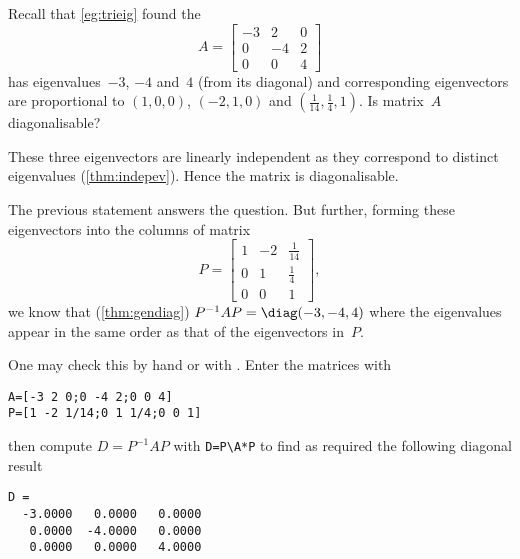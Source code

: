 \begin{example} \label{eg:trieigp}
Recall that \autoref{eg:trieig} found the 
\begin{equation*}
A=\begin{bmatrix}-3&2&0
\\0&-4&2
\\0&0&4\end{bmatrix}
\end{equation*}
has eigenvalues~\(-3\), \(-4\) and~\(4\) (from its diagonal) and corresponding eigenvectors are proportional to \((1,0,0)\), \((-2,1,0)\) and \((\frac1{14},\frac14,1)\).
Is matrix~\(A\) diagonalisable?
\begin{solution} 
These three eigenvectors are linearly independent as they correspond to distinct eigenvalues (\autoref{thm:indepev}).
Hence the matrix is diagonalisable.

The previous statement answers the question. 
But further, forming these eigenvectors into the columns of matrix
\begin{equation*}
P=\begin{bmatrix} 1&-2&\frac1{14}
\\0&1&\frac14
\\0&0&1 \end{bmatrix},
\end{equation*}
we know that (\autoref{thm:gendiag}) \(P^{-1}AP=\diag(-3,-4,4)\) where the eigenvalues appear in the same order as that of the eigenvectors in~\(P\).

One may check this by hand or with \script.
Enter the matrices with
\begin{verbatim}
A=[-3 2 0;0 -4 2;0 0 4]
P=[1 -2 1/14;0 1 1/4;0 0 1]
\end{verbatim}
\setbox\ajrqrbox\hbox{}\marginpar{\usebox{\ajrqrbox}}%
then compute \(D=P^{-1}AP\) with \verb|D=P\A*P| to find as required the following diagonal result
\begin{verbatim}
D =
  -3.0000   0.0000   0.0000
   0.0000  -4.0000   0.0000
   0.0000   0.0000   4.0000
\end{verbatim}
\end{solution}
\end{example}



